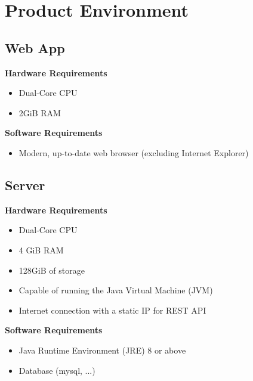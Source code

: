 \section{Product Environment}

\subsection{Web App}

\textbf{Hardware Requirements}
\begin{itemize}
    \item Dual-Core CPU
    \item 2GiB RAM
\end{itemize}

\textbf{Software Requirements}
\begin{itemize}
    \item Modern, up-to-date web browser (excluding Internet Explorer)
\end{itemize}

\subsection{Server}

\textbf{Hardware Requirements}
\begin{itemize}
    \item Dual-Core CPU
    \item 4 GiB RAM
    \item 128GiB of storage
    \item Capable of running the Java Virtual Machine (JVM)
    \item Internet connection with a static IP for REST API
\end{itemize}

\textbf{Software Requirements}
\begin{itemize}
    \item Java Runtime Environment (JRE) 8 or above
    \item Database (mysql, ...)
\end{itemize}